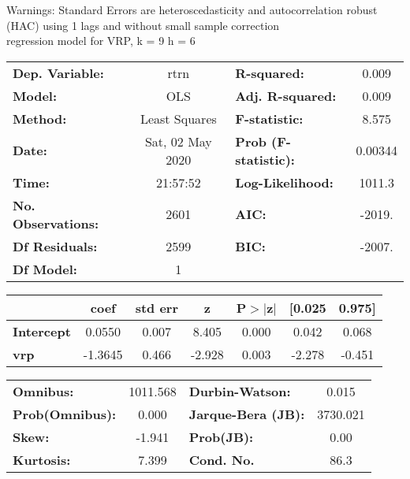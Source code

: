 Warnings: \newline
 [1] Standard Errors are heteroscedasticity and autocorrelation robust (HAC) using 1 lags and without small sample correction\\ 

regression model for VRP, k = 9 h = 6\begin{center}
\begin{tabular}{lclc}
\toprule
\textbf{Dep. Variable:}    &       rtrn       & \textbf{  R-squared:         } &     0.009   \\
\textbf{Model:}            &       OLS        & \textbf{  Adj. R-squared:    } &     0.009   \\
\textbf{Method:}           &  Least Squares   & \textbf{  F-statistic:       } &     8.575   \\
\textbf{Date:}             & Sat, 02 May 2020 & \textbf{  Prob (F-statistic):} &  0.00344    \\
\textbf{Time:}             &     21:57:52     & \textbf{  Log-Likelihood:    } &    1011.3   \\
\textbf{No. Observations:} &        2601      & \textbf{  AIC:               } &    -2019.   \\
\textbf{Df Residuals:}     &        2599      & \textbf{  BIC:               } &    -2007.   \\
\textbf{Df Model:}         &           1      & \textbf{                     } &             \\
\bottomrule
\end{tabular}
\begin{tabular}{lcccccc}
                   & \textbf{coef} & \textbf{std err} & \textbf{z} & \textbf{P$> |$z$|$} & \textbf{[0.025} & \textbf{0.975]}  \\
\midrule
\textbf{Intercept} &       0.0550  &        0.007     &     8.405  &         0.000        &        0.042    &        0.068     \\
\textbf{vrp}       &      -1.3645  &        0.466     &    -2.928  &         0.003        &       -2.278    &       -0.451     \\
\bottomrule
\end{tabular}
\begin{tabular}{lclc}
\textbf{Omnibus:}       & 1011.568 & \textbf{  Durbin-Watson:     } &    0.015  \\
\textbf{Prob(Omnibus):} &   0.000  & \textbf{  Jarque-Bera (JB):  } & 3730.021  \\
\textbf{Skew:}          &  -1.941  & \textbf{  Prob(JB):          } &     0.00  \\
\textbf{Kurtosis:}      &   7.399  & \textbf{  Cond. No.          } &     86.3  \\
\bottomrule
\end{tabular}
\end{center}


